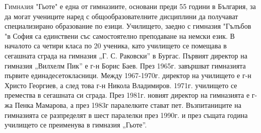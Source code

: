 \begin{multicols}{3}
\noindent \lettrine[lraise=0.2, nindent=0em, slope=-.5em]{Г}{имназия} "Гьоте" е 
една от гимназиите, основани преди 55 години в България, за да могат  учениците  
наред с общообразователните дисциплини да получават специализирано образование 
по езици. Училището, заедно с гимназия "Гълъбов "в София са единствени със 
самостоятелно преподаване на немски език.
В началото са четири класа по 20 ученика, като училището се помещава в сегашната 
сграда на гимназия „Г. С. Раковски” в Бургас. Първият директор на гимназия 
„Вилхелм Пик” е г-н Борис Баев. През 1965г. завършват гимназията първите 
единадесетокласници. Между 1967-1970г. директор на училището е г-н Христо 
Георгиев, а след това г-н Никола Владимиров. 1971г. училището се премества в 
сегашната си сграда. През 1981г. новият директор на гимназията е г-жа Пенка 
Мамарова, а през 1983г паралелките стават пет. Възпитаниците на гимназията се 
разпределят в шест паралелки през 1990г. и през същата година училището се 
преименува в гимназия „Гьоте”. 

\vspace{-5cm}


\end{multicols}
